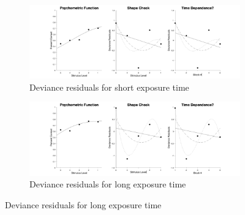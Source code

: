 \documentclass{article}
\begin{document}
\begin{figure}[!hb]
    \begin{subfigure}{\textwidth}
        \centering
        \includegraphics[width = \linewidth]{Thesis/plots/gof/cutNo/cutNo_go_short_deviance.png}
        \caption{Deviance residuals for short exposure time}
    \end{subfigure}
    
    \begin{subfigure}{\textwidth}
        \centering
        \includegraphics[width = \linewidth]{Thesis/plots/gof/cutNo/cutNo_go_long_deviance.png}
        \caption{Deviance residuals for long exposure time}
    \end{subfigure}
    
\end{figure}
\clearpage
\end{document}
